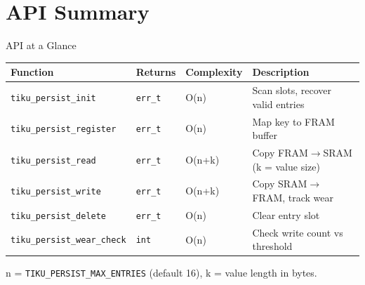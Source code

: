 \documentclass[aspectratio=169, 10pt]{beamer}
\begin{document}
\section{API Summary}

\begin{frame}{API at a Glance}
\begin{table}
\centering
\small
\begin{tabular}{@{}llll@{}}
\toprule
\textbf{Function} & \textbf{Returns} & \textbf{Complexity} & \textbf{Description} \\
\midrule
\texttt{tiku\_persist\_init}       & \texttt{err\_t} & O(n) & Scan slots, recover valid entries \\
\texttt{tiku\_persist\_register}   & \texttt{err\_t} & O(n) & Map key to FRAM buffer \\
\texttt{tiku\_persist\_read}       & \texttt{err\_t} & O(n+k) & Copy FRAM$\rightarrow$SRAM (k = value size) \\
\texttt{tiku\_persist\_write}      & \texttt{err\_t} & O(n+k) & Copy SRAM$\rightarrow$FRAM, track wear \\
\texttt{tiku\_persist\_delete}     & \texttt{err\_t} & O(n) & Clear entry slot \\
\texttt{tiku\_persist\_wear\_check} & \texttt{int}   & O(n) & Check write count vs threshold \\
\bottomrule
\end{tabular}
\end{table}

\vspace{0.3em}
\small n = \texttt{TIKU\_PERSIST\_MAX\_ENTRIES} (default 16), k = value length in bytes.


\end{frame}
\end{document}

